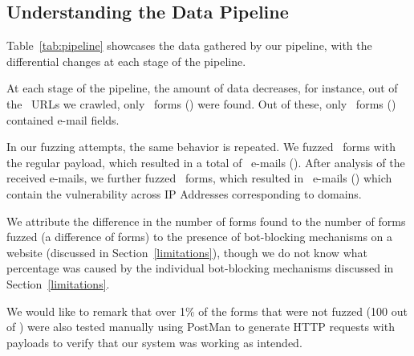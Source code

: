\subsection[The Pipeline]{Understanding the Data Pipeline}
Table~\ref{tab:pipeline} showcases the data gathered by our pipeline, with the differential changes at each stage of the pipeline. 

At each stage of the pipeline, the amount of data decreases, for instance, out of the \urls\ URLs we crawled, only \forms\ forms (\formsDelta) were found. Out of these, only \emailforms\ forms (\emailformsDelta) contained e-mail fields.

In our fuzzing attempts, the same behavior is repeated. We fuzzed \fuzzed\ forms with the regular payload, which resulted in a total of \recd\ e-mails (\recdDelta). After analysis of the received e-mails, we further fuzzed \malfuzzed\ forms, which resulted in \success\ e-mails (\successDelta) which contain the vulnerability across \ips IP Addresses corresponding to \domains domains.

We attribute the difference in the number of forms found to the number of forms fuzzed (a difference of \diffFoundFuzz forms) to the presence of bot-blocking mechanisms on a website (discussed in Section~\ref{limitations}), though we do not know what percentage was caused by the individual bot-blocking mechanisms discussed in Section~\ref{limitations}. 

We would like to remark that over 1\% of the forms that were not fuzzed (100 out of \diffFoundFuzz) were also tested manually using PostMan to generate HTTP requests with payloads to verify that our system was working as intended.




